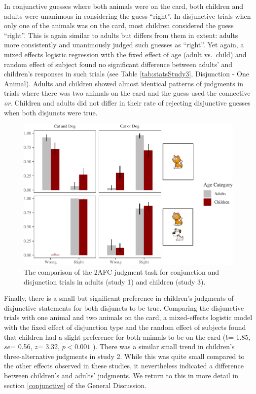 \documentclass[floatsintext,man]{apa6}
\theoremstyle{definition}
\theoremstyle{definition}
\theoremstyle{definition}
\theoremstyle{remark}
\begin{document}
In conjunctive guesses where both animals were on the card, both
children and adults were unanimous in considering the guess
\enquote{right}. In disjunctive trials when only one of the animals was
on the card, most children considered the guess \enquote{right}. This is
again similar to adults but differs from them in extent: adults more
consistently and unanimously judged such guesses as \enquote{right}. Yet
again, a mixed effects logistic regression with the fixed effect of age
(adult vs.~child) and random effect of subject found no significant
difference between adults' and children's responses in such trials (see
Table \ref{tab:statsStudy3}, Disjunction - One Animal). Adults and
children showed almost identical patterns of judgments in trials where
there was two animals on the card and the guess used the connective
\emph{or}. Children and adults did not differ in their rate of rejecting
disjunctive guesses when both disjuncts were true.

\begin{figure}
\centering
\includegraphics{figs/BinaryPlotComp-1.pdf}
\caption{\label{fig:BinaryPlotComp}The comparison of the 2AFC judgment task
for conjunction and disjunction trials in adults (study 1) and children
(study 3).}
\end{figure}

Finally, there is a small but significant preference in children's
judgments of disjunctive statements for both disjuncts to be true.
Comparing the disjunctive trials with one animal and two animals on the
card, a mixed-effects logistic model with the fixed effect of
disjunction type and the random effect of subjects found that children
had a slight preference for both animals to be on the card (\(b\)= 1.85,
\(se\)= 0.56, \(z\)= 3.32, \(p < 0.001\) ). There was a similar small
trend in children's three-alternative judgments in study 2. While this
was quite small compared to the other effects observed in these studies,
it nevertheless indicated a difference between children's and adults'
judgments. We return to this in more detail in section \ref{conjunctive}
of the General Discussion.
\end{document}
